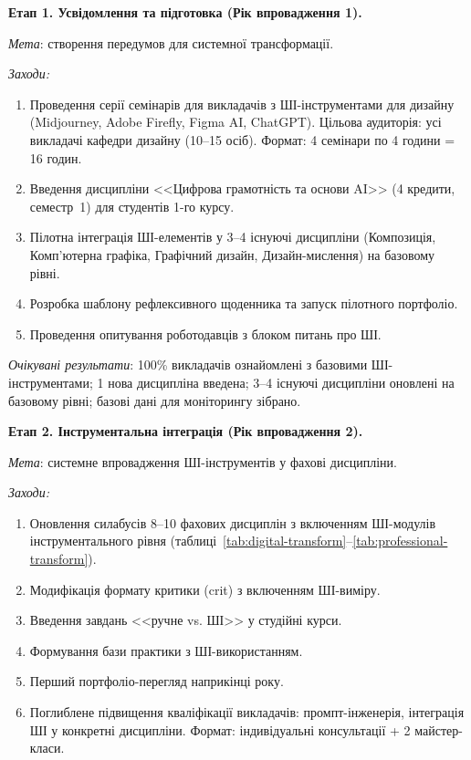 \textbf{Етап 1. Усвідомлення та підготовка (Рік впровадження 1).}

\textit{Мета}: створення передумов для системної трансформації.

\textit{Заходи:}
\begin{enumerate}
    \item Проведення серії семінарів для викладачів з ШІ-інструментами для дизайну (Midjourney, Adobe Firefly, Figma AI, ChatGPT). Цільова аудиторія: усі викладачі кафедри дизайну (10--15 осіб). Формат: 4 семінари по 4 години = 16 годин.
    \item Введення дисципліни <<Цифрова грамотність та основи AI>> (4 кредити, семестр~1) для студентів 1-го курсу.
    \item Пілотна інтеграція ШІ-елементів у 3--4 існуючі дисципліни (Композиція, Комп'ютерна графіка, Графічний дизайн, Дизайн-мислення) на базовому рівні.
    \item Розробка шаблону рефлексивного щоденника та запуск пілотного портфоліо.
    \item Проведення опитування роботодавців з блоком питань про ШІ.
\end{enumerate}

\textit{Очікувані результати}: 100\% викладачів ознайомлені з базовими ШІ-інструментами; 1 нова дисципліна введена; 3--4 існуючі дисципліни оновлені на базовому рівні; базові дані для моніторингу зібрано.

\textbf{Етап 2. Інструментальна інтеграція (Рік впровадження 2).}

\textit{Мета}: системне впровадження ШІ-інструментів у фахові дисципліни.

\textit{Заходи:}
\begin{enumerate}
    \item Оновлення силабусів 8--10 фахових дисциплін з включенням ШІ-модулів інструментального рівня (таблиці~\ref{tab:digital-transform}--\ref{tab:professional-transform}).
    \item Модифікація формату критики (crit) з включенням ШІ-виміру.
    \item Введення завдань <<ручне vs. ШІ>> у студійні курси.
    \item Формування бази практики з ШІ-використанням.
    \item Перший портфоліо-перегляд наприкінці року.
    \item Поглиблене підвищення кваліфікації викладачів: промпт-інженерія, інтеграція ШІ у конкретні дисципліни. Формат: індивідуальні консультації + 2 майстер-класи.
\end{enumerate}

